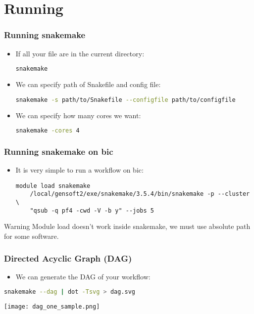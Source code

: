 \documentclass{beamer}
\begin{document}
\section{Running}

\begin{frame}[fragile]
    \frametitle{Running snakemake}
    \begin{itemize}
        \item If all your file are in the current directory:
            \begin{lstlisting}[language=bash]
    snakemake
            \end{lstlisting}
        \item We can specify path of Snakefile and config file:
            \begin{lstlisting}[language=bash]
    snakemake -s path/to/Snakefile --configfile path/to/configfile
            \end{lstlisting}
        \item We can specify how many cores we want:
            \begin{lstlisting}[language=bash]
    snakemake -cores 4
            \end{lstlisting}
    \end{itemize}
\end{frame}

\begin{frame}[fragile]
    \frametitle{Running snakemake on bic}
    \begin{itemize}
        \item It is very simple to run a workflow on bic:
            \begin{lstlisting}[language={}]
    module load snakemake
    /local/gensoft2/exe/snakemake/3.5.4/bin/snakemake -p --cluster \
    "qsub -q pf4 -cwd -V -b y" --jobs 5
            \end{lstlisting}
    \end{itemize}
    \begin{alertblock}{Warning}
        Module load doesn't work inside snakemake, we must use absolute path for some software.
    \end{alertblock}
\end{frame}

\begin{frame}[fragile]
    \frametitle{Directed Acyclic Graph (DAG)}
    \begin{itemize}
        \item We can generate the DAG of your workflow:
    \end{itemize}
    \begin{lstlisting}[language=bash]
        snakemake --dag | dot -Tsvg > dag.svg
    \end{lstlisting}
    \begin{center}
        \texttt{[image: dag\_one\_sample.png]}
    \end{center}
\end{frame}
\end{document}
